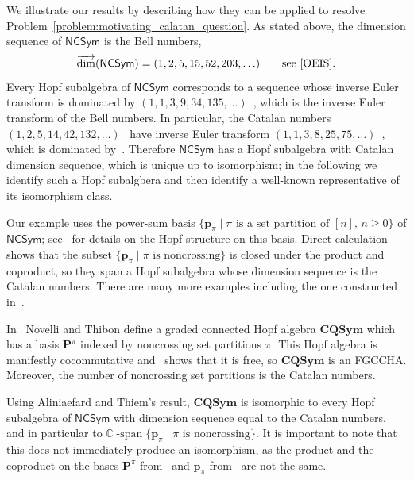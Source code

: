 \documentclass[11pt]{amsart}
\theoremstyle{definition}
\newtheorem{example}[theorem]{Example}
\numberwithin{equation}{section}
\def\CC{{\mathbb C}}
\newcommand{\FGCCHA}{\textsf{FGCCHA}\xspace}
\newcommand{\vecdim}{\overrightarrow{\dim}}
\newcommand{\NCSym}{\mathsf{NCSym}}
\begin{document}
\vspace{4ex}

We illustrate our results by describing how they can be applied to resolve Problem~\ref{problem:motivating_calatan_question}.  
As stated above, the dimension sequence of $\NCSym$ is the Bell numbers,
\[
\vecdim(\NCSym) = (1, 2, 5, 15, 52, 203, \ldots)
\qquad\text{see~\cite[\href{https://oeis.org/A000110}{A000110}]{OEIS}.}
\]
Every Hopf subalgebra of $\NCSym$ corresponds to a sequence whose inverse Euler transform is dominated by $(1, 1, 3, 9, 34, 135,\ldots)$~\cite[\href{https://oeis.org/A085686}{A085686}]{OEIS}, which is  the inverse Euler transform of the Bell numbers.  
In particular, the Catalan numbers $(1, 2, 5, 14, 42, 132, \ldots)$~\cite[\href{https://oeis.org/A000108}{A000108}]{OEIS} have inverse Euler transform $(1, 1, 3, 8, 25, 75,\ldots)$~\cite[\href{https://oeis.org/A022553}{A022553}]{OEIS}, which is dominated by~\cite[\href{https://oeis.org/A085686}{A085686}]{OEIS}.  
Therefore $\NCSym$ has a Hopf subalgebra with Catalan dimension sequence, which is unique up to isomorphism; in the following we identify such a Hopf subalgbera and then identify a well-known representative of its isomorphism class.  

Our example uses the power-sum basis $\{\mathbf{p}_{\pi} \;|\; \text{$\pi$ is a set partition of $[n]$, $n \ge 0$}\}$ of $\mathsf{NCSym}$; see~\cite{BHRZ05} for details on the Hopf structure on this basis.  
Direct calculation shows that the subset $\{\mathbf{p}_{\pi} \;|\; \text{$\pi$ is noncrossing}\}$ is closed under the product and coproduct, so they span a Hopf subalgebra whose dimension sequence is the Catalan numbers.  
There are many more examples including the one constructed in~\cite{AT20}.

In~\cite{NT05} Novelli and Thibon define a graded connected Hopf algebra $\mathbf{CQSym}$ which has a basis $\mathbf{P}^{\pi}$ indexed by noncrossing set partitions $\pi$.  
This Hopf algebra is manifestly cocommutative and~\cite[Proposition 5.2]{NT05} shows that it is free, so $\mathbf{CQSym}$ is an \FGCCHA.  
Moreover, the number of noncrossing set partitions is the Catalan numbers.

Using Aliniaefard and Thiem's result, $\mathbf{CQSym}$ is isomorphic to every Hopf subalgebra of $\NCSym$ with dimension sequence equal to the Catalan numbers, and in particular to $\CC\operatorname{-span}\{\mathbf{p}_{\pi} \;|\; \text{$\pi$ is noncrossing}\}$.  
It is important to note that this does not immediately produce an isomorphism, as the product and the coproduct on the bases $\mathbf{P}^{\pi}$ from~\cite{NT05} and $\mathbf{p}_{\pi}$ from~\cite{BHRZ05} are not the same.
\end{document}
